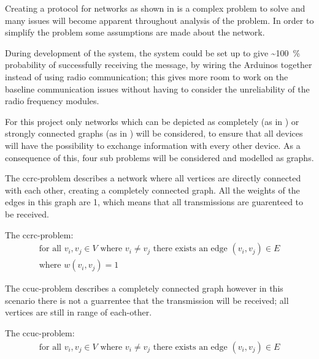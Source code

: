 \noindent
Creating a protocol for networks as shown in  is a complex problem to solve and many issues will become apparent throughout analysis of the problem.
In order to simplify the problem some assumptions are made about the network.

During development of the system, the system could be set up to give \textasciitilde100~\% probability of successfully receiving the message, by wiring the Arduinos together instead of using radio communication; this gives more room to work on the baseline communication issues without having to consider the unreliability of the radio frequency modules.

For this project only networks which can be depicted as completely (as in ) or strongly connected graphs (as in ) will be considered, to ensure that all devices will have the possibility to exchange information with every other device.
As a consequence of this, four sub problems will be considered and modelled as graphs.

\bigskip

\noindent The \gls{ccrc}-problem describes a network where all vertices are directly connected with each other, creating a completely connected graph.
All the weights of the edges in this graph are 1, which means that all transmissions are guarenteed to be received. 	

\begin{definition}\label{CCRCdef}
	The \acrshort{ccrc}-problem:
	\begin{align*}
		\text{for all } v_i, v_j \in V \text{ where } v_i \neq v_j \text{ there exists an edge } (v_i, v_j) \in E\\
		\text{where } w(v_i, v_j) = 1
	\end{align*}
\end{definition}

\noindent The \gls{ccuc}-problem describes a completely connected graph however in this scenario there is not a guarrentee that the transmission will be received; all vertices are still in range of each-other.

\begin{definition}
	The \acrshort{ccuc}-problem:
	\begin{align*}
		\text{for all } v_i, v_j \in V \text{ where } v_i \neq v_j \text{ there exists an edge } (v_i, v_j) \in E		%
	\end{align*}
\end{definition} 

